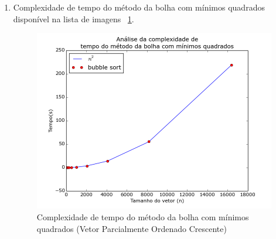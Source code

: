\documentclass[12pt,a4paper,twoside]{report}
\begin{document}
\begin{enumerate}
\begin{enumerate}
								
								\item Complexidade de tempo do método da bolha com mínimos quadrados disponível na lista de imagens  ~\ref{fig:BubblePlot3POC}.
								\begin{figure}[!h]
									\centering
									\includegraphics[scale=0.6]{../imagens/Bubble/bubble_plot_3_parcialmente_ordenado_crescente.png}
									\caption{Complexidade de tempo do método da bolha com mínimos quadrados (Vetor Parcialmente Ordenado Crescente) \label{fig:BubblePlot3POC}}
								\end{figure}
							
							\end{enumerate}
			

\end{enumerate}
\end{document}
